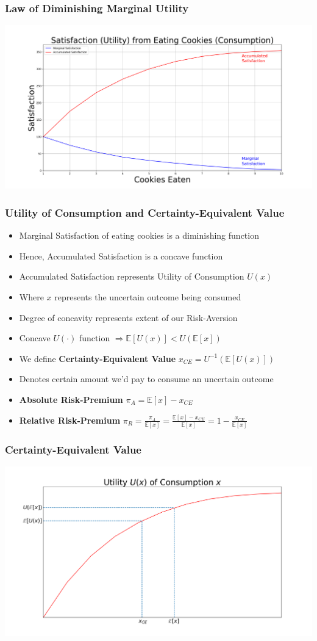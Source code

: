 \documentclass[handout]{beamer}
\begin{document}
\begin{frame}
\frametitle{Law of Diminishing Marginal Utility}
\includegraphics[scale=0.32]{utility.png}
\end{frame}

\begin{frame}
\frametitle{Utility of Consumption and Certainty-Equivalent Value}
\pause
\begin{itemize}[<+->]
\item Marginal Satisfaction of eating cookies is a diminishing function
\item Hence, Accumulated Satisfaction is a concave function
\item Accumulated Satisfaction represents Utility of Consumption $U(x)$
\item Where $x$ represents the uncertain outcome being consumed
\item Degree of concavity represents extent of our Risk-Aversion
\item Concave $U(\cdot)$ function $\Rightarrow \mathbb{E}[U(x)] <  U(\mathbb{E}[x])$
\item We define {\bf Certainty-Equivalent Value} $x_{CE} = U^{-1}(\mathbb{E}[U(x)])$
\item Denotes certain amount we'd pay to consume an uncertain outcome
\item {\bf Absolute Risk-Premium} $\pi_A = \mathbb{E}[x] - x_{CE}$
\item {\bf Relative Risk-Premium} $\pi_R = \frac {\pi_A} {\mathbb{E}[x]} = \frac{\mathbb{E}[x] - x_{CE}} {\mathbb{E}[x]} = 1 - \frac {x_{CE}} {\mathbb{E}[x]}$
\end{itemize}
\end{frame}

\begin{frame}
\frametitle{Certainty-Equivalent Value}
\includegraphics[scale=0.32]{ce.png}
\end{frame}
\end{document}

